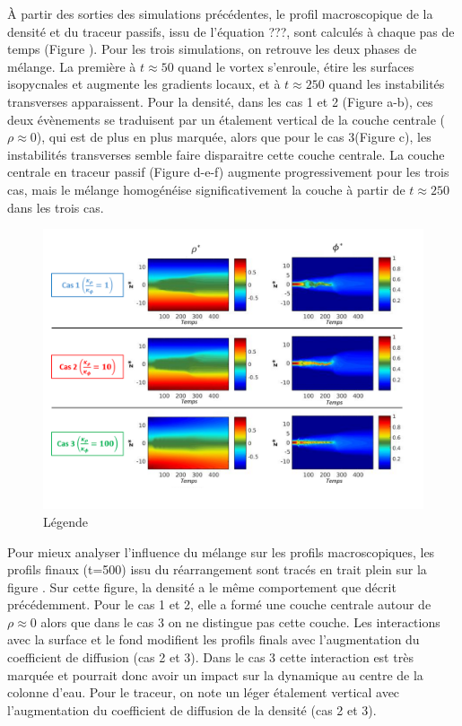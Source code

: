 \documentclass[a4paper,12pt]{article}
\begin{document}
    À partir des sorties des simulations précédentes, le profil macroscopique de la densité et du traceur passifs, issu de l'équation ???, sont calculés à chaque pas de temps (Figure ). Pour les trois simulations, on retrouve les deux phases de mélange. La première à $t\approx50$ quand le vortex s'enroule, étire les surfaces isopycnales et augmente les gradients locaux, et à $t\approx250$ quand les instabilités transverses apparaissent. Pour la densité, dans les cas 1 et 2 (Figure a-b), ces deux évènements se traduisent par un étalement vertical de la couche centrale ($\rho\approx 0$), qui est de plus en plus marquée, alors que pour le cas 3(Figure c), les instabilités transverses semble faire disparaitre cette couche centrale. La couche centrale en traceur passif (Figure d-e-f) augmente progressivement pour les trois cas, mais le mélange homogénéise significativement la couche à partir de $t\approx 250$ dans les trois cas. 
    \\
    \begin{figure}[!h]
        \centering
        \label{rhodiff_star}
        \includegraphics[width=0.9\linewidth]{figures/rhodiff_star.png}
        \caption{Légende}
    \end{figure}
    Pour mieux analyser l'influence du mélange sur les profils macroscopiques, les profils finaux (t=500) issu du réarrangement sont tracés en trait plein sur la figure . Sur cette figure, la densité a le même comportement que décrit précédemment. Pour le cas 1 et 2, elle a formé une couche centrale autour de $\rho\approx0$ alors que dans le cas 3 on ne distingue pas cette couche. Les interactions avec la surface et le fond modifient les profils finals avec l'augmentation du coefficient de diffusion (cas 2 et 3). Dans le cas 3 cette interaction est très marquée et pourrait donc avoir un impact sur la dynamique au centre de la colonne d'eau. Pour le traceur, on note un léger étalement vertical avec l'augmentation du coefficient de diffusion de la densité (cas 2 et 3).\\ 
    
\end{document}
